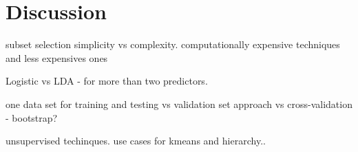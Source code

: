 \chapter{Discussion}
\label{chp:disc}
subset selection simplicity vs complexity. computationally expensive techniques and less expensives ones

Logistic vs LDA - for more than two predictors.

one data set for training and testing vs validation set approach vs cross-validation - bootstrap?

unsupervised techinques. use cases for kmeans and hierarchy..


